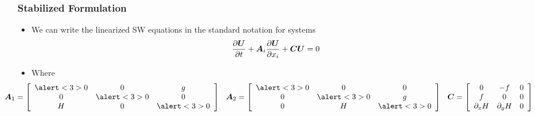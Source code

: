 
\begin{frame}[t]
  \frametitle{Stabilized Formulation}
  \begin{itemize}[<+->]
  \item{We can write the linearized SW equations in the standard notation
    for systems
    \begin{equation}
  \nonumber
  \frac{\partial {\boldsymbol{U}}}{\partial t}
  + {\boldsymbol{A}}_i\frac{\partial {\boldsymbol{U}}}{\partial x_i}
  + {\boldsymbol{C}} {\boldsymbol{U}}
  = 0
  \end{equation}
  }

    \item{Where
\begin{equation}
  \nonumber
  \hspace{-.5in}
  \bv{A}_1 = \begin{bmatrix}
    \begin{array}{ccc}
      \alert<3>{0} & 0 & g  \\
      0 & \alert<3>{0} & 0  \\
      H & 0 & \alert<3>{0} 
    \end{array}
  \end{bmatrix}
  \hspace{.1in}
  \bv{A}_2 = \begin{bmatrix}
    \begin{array}{ccc}
      \alert<3>{0} & 0 & 0  \\
      0 & \alert<3>{0} & g  \\
      0 & H & \alert<3>{0} 
    \end{array}
  \end{bmatrix}
  \hspace{.1in}
  \bv{C} = \begin{bmatrix}
    \begin{array}{ccc}
      0 & -f & 0  \\
      f & 0 & 0  \\
      \partial_x H & \partial_y H & 0 
    \end{array}
  \end{bmatrix}
\end{equation}
      }
  \end{itemize}
\end{frame}


